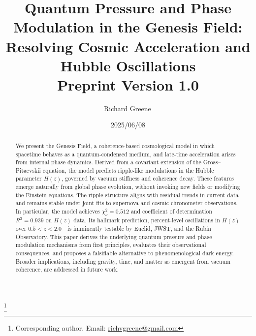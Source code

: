 \documentclass[aps,prd,preprint,12pt,superscriptaddress,nofootinbib]{revtex4-2}
\begin{document}
\title{\texorpdfstring{
\textbf{Quantum Pressure and Phase Modulation in the Genesis Field: Resolving Cosmic Acceleration and Hubble Oscillations} \\
\normalsize Preprint Version 1.0
}{The Genesis Field: Phase Modulation and the Hubble Tension}}

\author{Richard Greene\,}
\thanks{Corresponding author. Email: \href{mailto:richvgreene@gmail.com}{richvgreene@gmail.com}}
\date{2025/06/08}

\begin{abstract}
\noindent
\justifying
We present the Genesis Field, a coherence-based cosmological model in which spacetime behaves as a quantum-condensed medium, and late-time acceleration arises from internal phase dynamics. Derived from a covariant extension of the Gross–Pitaevskii equation, the model predicts ripple-like modulations in the Hubble parameter \( H(z) \), governed by vacuum stiffness and coherence decay. These features emerge naturally from global phase evolution, without invoking new fields or modifying the Einstein equations. The ripple structure aligns with residual trends in current data and remains stable under joint fits to supernova and cosmic chronometer observations. In particular, the model achieves \( \chi^2_\nu = 0.512 \) and coefficient of determination \( R^2 = 0.939 \) on $H(z)$ data. Its hallmark prediction, percent-level oscillations in \( H(z) \) over \( 0.5 < z < 2.0 \)—is imminently testable by Euclid, JWST, and the Rubin Observatory. This paper derives the underlying quantum pressure and phase modulation mechanisms from first principles, evaluates their observational consequences, and proposes a falsifiable alternative to phenomenological dark energy. Broader implications, including gravity, time, and matter as emergent from vacuum coherence, are addressed in future work.
\end{abstract}

\maketitle
\clearpage
\tableofcontents
\clearpage


\end{document}
